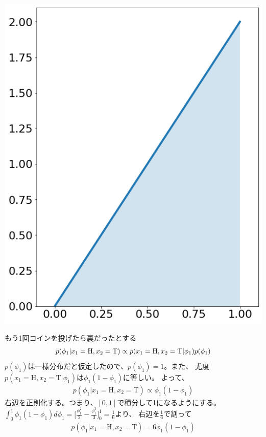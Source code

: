 \documentclass[aspectratio=169,unicode,dvipdfmx,14pt]{beamer}
\begin{document}
\begin{frame}
\begin{textblock*}{0.4\linewidth}
    \includegraphics[width=\linewidth]{beta_2_1.png}
\end{textblock*}
\end{frame}

\begin{frame}{もう1回コインを投げたら裏だったとする}
\vspace{-.3in}
\begin{align}
p(\phi_1 | x_1 = \mbox{H}, x_2 = \mbox{T}) 
\propto p(x_1 = \mbox{H}, x_2 = \mbox{T} | \phi_1) p(\phi_1)
\notag
\end{align}
$p(\phi_1)$は一様分布だと仮定したので、$p(\phi_1)=1$。また、
尤度$p(x_1 = \mbox{H}, x_2 = \mbox{T} | \phi_1)$は$\phi_1(1-\phi_1)$に等しい。
よって、
\begin{align}
p(\phi_1 | x_1 = \mbox{H}, x_2 = \mbox{T}) \propto \phi_1(1-\phi_1)
\end{align}
右辺を正則化する。つまり、$[0,1]$で積分して1になるようにする。
$\int_0^1 \phi_1(1-\phi_1) d\phi_1 = \Big[ \frac{\phi_1^2}{2} - \frac{\phi_1^3}{3} \Big]_0^1= \frac{1}{6}$より、
右辺を$\frac{1}{6}$で割って
\begin{align}
p(\phi_1 | x_1 = \mbox{H}, x_2 = \mbox{T}) = 6\phi_1(1-\phi_1)
\end{align}
\end{frame}
\end{document}
